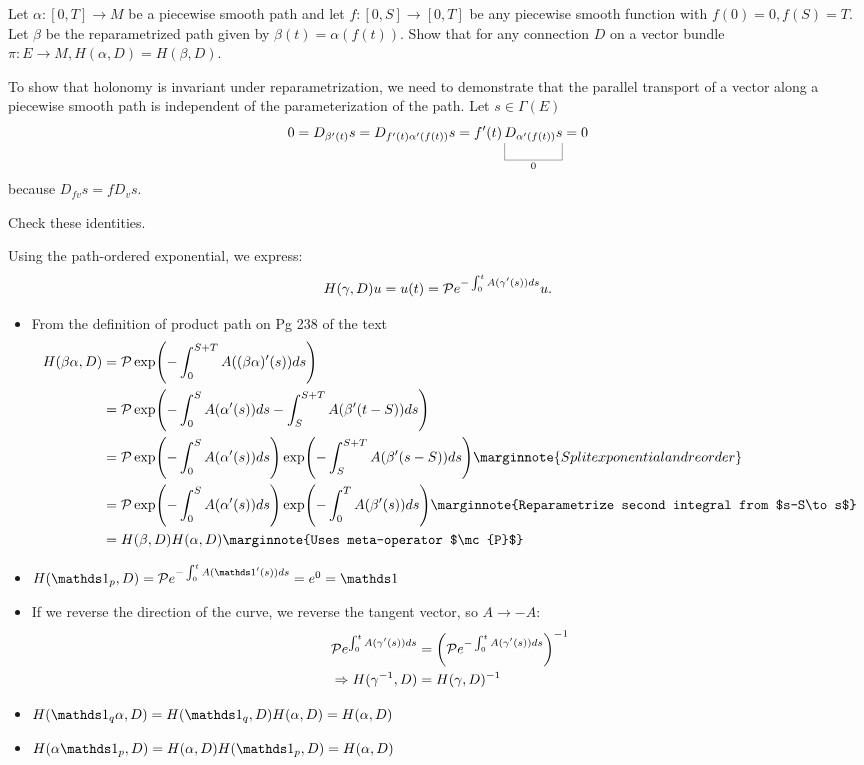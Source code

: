 \documentclass[10pt]{article}
\begin{document}
\begin{example}
	Let $\alpha:[0,T]\to M$ be a piecewise smooth path and let $f:[0,S]\to [0,T]$ be any piecewise smooth function with $f(0)=0,f(S)=T$. Let $\beta$ be the reparametrized path given by $\beta(t)=\alpha(f(t))$. Show that for any connection $D$ on a vector bundle $\pi:E\to M, H(\alpha,D)=H(\beta,D)$.
\end{example}
\sol To show that holonomy is invariant under reparametrization, we need to demonstrate that the parallel transport of a vector along a piecewise smooth path is independent of the parameterization of the path. Let $s \in \Gamma(E)$
$$
	0 = D_{\beta^\prime(t)}s = D_{f^\prime(t)\alpha^\prime(f(t))}s = f^\prime(t)\ub{D_{\alpha^\prime(f(t))}s}{0} = 0
$$
because $D_{fv}s = fD_vs$.


\begin{example}\label{b2e91}
	Check these identities.
\end{example}
\sol Using the path-ordered exponential, we express:
$$
H(\gamma,D)u=u(t)=\mc{P}e^{-\int_{0}^{t}A(\gamma^\prime(s))ds}u.
$$
\begin{itemize}
	\item From the definition of product path on Pg 238 of the text$$
	\begin{aligned}
		H(\beta\alpha,D) &= \mc{P}\exp\p*{-\int_{0}^{S+T}A((\beta\alpha)^\prime(s))ds}\\
		&= \mc{P}\exp\p*{-\int_{0}^{S}A(\alpha^\prime(s))ds-\int_{S}^{S+T}A(\beta^\prime(t-S))ds}\\
		&= \mc{P}\exp\p*{-\int_{0}^{S}A(\alpha^\prime(s))ds}\exp\p*{-\int_{S}^{S+T}A(\beta^\prime(s-S))ds}\marginnote{Split exponential and reorder}\\
		&= \mc{P}\exp\p*{-\int_{0}^{S}A(\alpha^\prime(s))ds}\exp\p*{-\int_{0}^{T}A(\beta^\prime(s))ds}\marginnote{Reparametrize second integral from $s-S\to s$}\\
		&= H(\beta,D)H(\alpha,D)\marginnote{Uses meta-operator $\mc{P}$}
	\end{aligned}$$
	\item $H(\id_p,D)=\mc{P}e^{-\int_{0}^{t}A(\id^\prime(s))ds} = e^0 = \id$
	\item If we reverse the direction of the curve, we reverse the tangent vector, so $A\to-A$:
	$$
	\begin{aligned}
		\mc{P}e^{\int_{0}^{t}A(\gamma^\prime(s))ds} &= \p*{\mc{P}e^{-\int_{0}^{t}A(\gamma^\prime(s))ds}}^{-1}\\
		\Rightarrow H(\gamma^{-1},D) &= H(\gamma,D)^{-1}
	\end{aligned}
	$$
	\item $H(\id_q\alpha,D) = H(\id_q,D)H(\alpha,D) = H(\alpha,D)$
	\item $H(\alpha \id_p,D) = H(\alpha,D)H(\id_p,D) = H(\alpha,D)$
\end{itemize}
\end{document}
